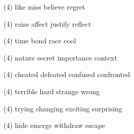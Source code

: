 \begin{tasks}(4)
	\task like
	\task miss
	\task believe
	\task regret
\end{tasks}
\item
\begin{tasks}(4)
	\task raise
	\task affect
	\task justify
	\task reflect
\end{tasks}
\item
\begin{tasks}(4)
	\task time
	\task bond
	\task race
	\task cool
\end{tasks}
\item
\begin{tasks}(4)
	\task nature
	\task secret
	\task importance
	\task context
\end{tasks}
\item
\begin{tasks}(4)
	\task cheated
	\task defeated
	\task confused
	\task confronted
\end{tasks}
\item
\begin{tasks}(4)
	\task terrible
	\task hard
	\task strange
	\task wrong
\end{tasks}
\item
\begin{tasks}(4)
	\task trying
	\task changing
	\task exciting
	\task surprising
\end{tasks}
\item
\begin{tasks}(4)
	\task hide
	\task emerge
	\task withdraw
	\task escape
\end{tasks}